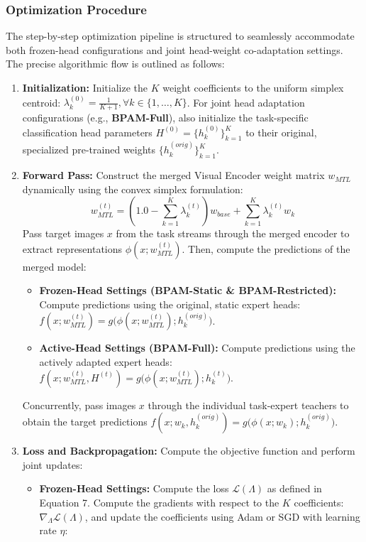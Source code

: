 \subsubsection{Optimization Procedure}
The step-by-step optimization pipeline is structured to seamlessly accommodate both frozen-head configurations and joint head-weight co-adaptation settings. The precise algorithmic flow is outlined as follows:
\begin{enumerate}
    \item {\bf Initialization:} Initialize the $K$ weight coefficients to the uniform simplex centroid: $\lambda_k^{(0)} = \frac{1}{K+1}, \forall k \in \{1, \dots, K\}$. For joint head adaptation configurations (e.g., {\bf BPAM-Full}), also initialize the task-specific classification head parameters $H^{(0)} = \{h_k^{(0)}\}_{k=1}^K$ to their original, specialized pre-trained weights $\{h_k^{(orig)}\}_{k=1}^K$.
    \item {\bf Forward Pass:} Construct the merged Visual Encoder weight matrix $w_{MTL}$ dynamically using the convex simplex formulation:
    \begin{equation}
        w_{MTL}^{(t)} = \left(1.0 - \sum_{k=1}^K \lambda_k^{(t)}\right) w_{base} + \sum_{k=1}^K \lambda_k^{(t)} w_k
    \end{equation}
    Pass target images $x$ from the task streams through the merged encoder to extract representations $\phi(x; w_{MTL}^{(t)})$. Then, compute the predictions of the merged model:
    \begin{itemize}
        \item {\bf Frozen-Head Settings (BPAM-Static \& BPAM-Restricted):} Compute predictions using the original, static expert heads: $f(x; w_{MTL}^{(t)}) = g\big(\phi(x; w_{MTL}^{(t)}); h_k^{(orig)}\big)$.
        \item {\bf Active-Head Settings (BPAM-Full):} Compute predictions using the actively adapted expert heads: $f(x; w_{MTL}^{(t)}, H^{(t)}) = g\big(\phi(x; w_{MTL}^{(t)}); h_k^{(t)}\big)$.
    \end{itemize}
    Concurrently, pass images $x$ through the individual task-expert teachers to obtain the target predictions $f(x; w_k, h_k^{(orig)}) = g\big(\phi(x; w_k); h_k^{(orig)}\big)$.
    \item {\bf Loss and Backpropagation:} Compute the objective function and perform joint updates:
    \begin{itemize}
        \item {\bf Frozen-Head Settings:} Compute the loss $\mathcal{L}(\Lambda)$ as defined in Equation 7. Compute the gradients with respect to the $K$ coefficients: $\nabla_\Lambda \mathcal{L}(\Lambda)$, and update the coefficients using Adam or SGD with learning rate $\eta$:

\end{itemize}
\end{enumerate}
